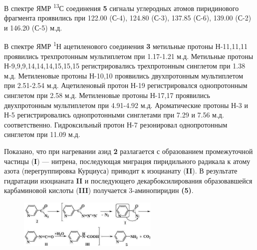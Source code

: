 \begin{multicols}{2}
В спектре ЯМР \textsuperscript{13}С соединения {\bfseries 5} сигналы
углеродных атомов пиридинового фрагмента проявились при 122.00 (С-4),
124.80 (С-3), 137.85 (С-6), 139.00 (С-2) и 146.20 (С-5) м.д.

В спектре ЯМР \textsuperscript{1}Н ацетиленового соединения {\bfseries 3}
метильные протоны Н-11,11,11 проявились трехпротонным мультиплетом при
1.17-1.21 м.д. Метильные протоны Н-9,9,9,14,14,14,15,15,15
регистрировались трехпротонным синглетом при 1.38 м.д. Метиленовые
протоны Н-10,10 проявились двухпротонным мультиплетом при 2.51-2.54 м.д.
Ацетиленовый протон Н-19 регистрировался однопротонным синглетом при
2.58 м.д. Метиленовые протоны Н-17,17 проявились двухпротонным
мультиплетом при 4.91-4.92 м.д. Ароматические протоны Н-3 и Н-5
регистрировались однопротонными синглетами при 7.29 и 7.56 м.д.
соответственно. Гидроксильный протон Н-7 резонировал однопротонным
синглетом при 11.09 м.д.

Показано, что при нагревании азид {\bfseries 2} разлагается с образованием
промежуточной частицы ({\bfseries I}) --- нитрена, последующая миграция
пиридильного радикала к атому азота (перегруппировка Курциуса) приводит
к изоцианату ({\bfseries II}). В результате гидратации изоцианата
{\bfseries II} и последующего декарбоксилирования образовавшейся
карбаминовой кислоты ({\bfseries III}) получается 3-аминопиридин
{\bfseries (5)}.
\end{multicols}

\begin{figure}[H]
	\centering
	\includegraphics[width=0.6\textwidth]{assets/4}
\end{figure}

